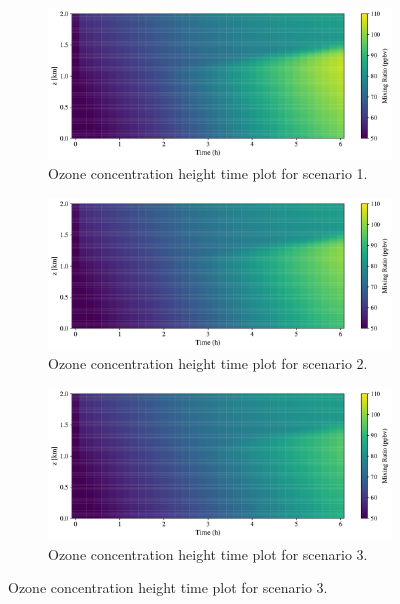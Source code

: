 \begin{figure}[h]
  \centering
  \begin{subfigure}
    \centering
    \includegraphics[width=.8\textwidth]{figures/height-time-o3-fx1fy0.pdf}
    \caption{Ozone concentration height time plot for scenario 1.}
  \end{subfigure}
     \vspace*{5mm} 
  \begin{subfigure}
    \centering
    \includegraphics[width=.8\textwidth]{figures/height-time-o3-road-10x.pdf}
    \caption{Ozone concentration height time plot for scenario 2.}
  \end{subfigure}
   \vspace*{5mm} 
  \begin{subfigure}
    \centering
    \includegraphics[width=.8\textwidth]{figures/height-time-o3-point-source-1x1.pdf}
    \caption{Ozone concentration height time plot for scenario 3.}
  \end{subfigure}
\end{figure}

